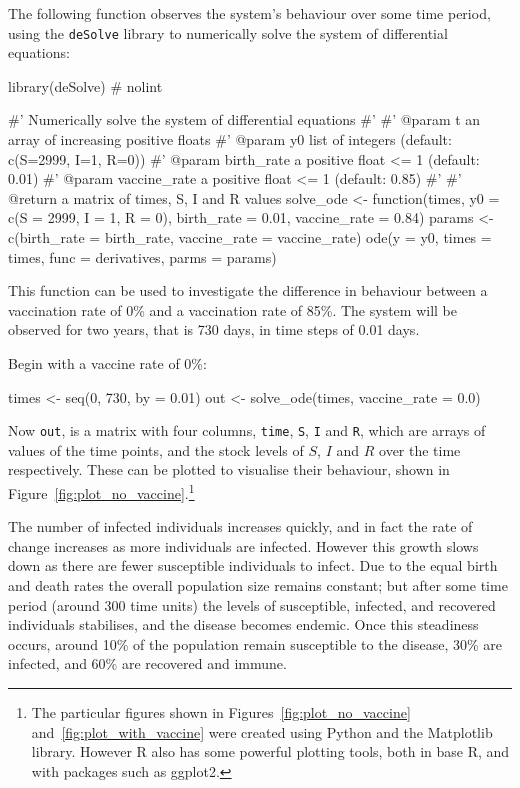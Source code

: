 The following function observes the system's behaviour over some time period,
using the \texttt{deSolve} library to numerically solve the system of
differential equations:

\begin{Rin}
library(deSolve)  # nolint

#' Numerically solve the system of differential equations
#'
#' @param t an array of increasing positive floats
#' @param y0 list of integers (default: c(S=2999, I=1, R=0))
#' @param birth_rate a positive float <= 1 (default: 0.01)
#' @param vaccine_rate a positive float <= 1 (default: 0.85)
#'
#' @return a matrix of times, S, I and R values
solve_ode <- function(times,
                          y0 = c(S = 2999, I = 1, R = 0),
                          birth_rate = 0.01,
                          vaccine_rate = 0.84){
  params <- c(birth_rate = birth_rate,
    vaccine_rate = vaccine_rate)
    ode(y = y0,
      times = times,
      func = derivatives,
      parms = params)
}
\end{Rin}

This function can be used to investigate the difference in behaviour between
a vaccination rate of 0\% and a vaccination rate of 85\%. The system will be
observed for two years, that is 730 days, in time steps of 0.01 days.

Begin with a vaccine rate of 0\%:

\begin{Rin}
times <- seq(0, 730, by = 0.01)
out <- solve_ode(times, vaccine_rate = 0.0)
\end{Rin}

Now \texttt{out}, is a matrix with four columns,  \texttt{time},
\texttt{S}, \texttt{I} and \texttt{R}, which are arrays of
values of the time points, and the stock levels of $S$, $I$ and $R$ over the
time respectively.
These can be plotted to visualise their behaviour, shown in
Figure~\ref{fig:plot_no_vaccine}.\footnote{The particular figures shown in
Figures~\ref{fig:plot_no_vaccine} and~\ref{fig:plot_with_vaccine} were created
using Python and the Matplotlib library. However R also has some powerful
plotting tools, both in base R, and with packages such as ggplot2.}

The number of infected individuals increases quickly, and in fact the rate of
change increases as more individuals are infected. However this growth slows
down as there are fewer susceptible individuals to infect. Due to the equal
birth and death rates the overall population size remains constant; but after
some time period (around 300 time units) the levels of susceptible, infected,
and recovered individuals stabilises, and the disease becomes endemic. Once this
steadiness occurs, around 10\% of the population remain susceptible to the
disease, 30\% are infected, and 60\% are recovered and immune.

